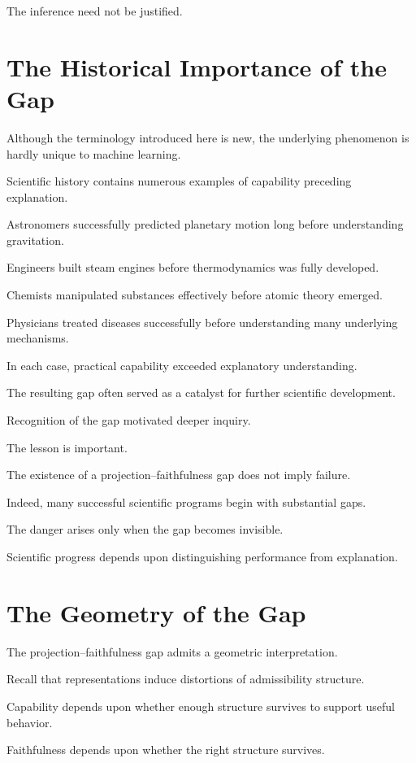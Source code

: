 \documentclass[11pt,oneside,openany]{book}
\begin{document}
The inference need not be justified.

\section{The Historical Importance of the Gap}

Although the terminology introduced here is new, the underlying phenomenon is hardly unique to machine learning.

Scientific history contains numerous examples of capability preceding explanation.

Astronomers successfully predicted planetary motion long before understanding gravitation.

Engineers built steam engines before thermodynamics was fully developed.

Chemists manipulated substances effectively before atomic theory emerged.

Physicians treated diseases successfully before understanding many underlying mechanisms.

In each case, practical capability exceeded explanatory understanding.

The resulting gap often served as a catalyst for further scientific development.

Recognition of the gap motivated deeper inquiry.

The lesson is important.

The existence of a projection--faithfulness gap does not imply failure.

Indeed, many successful scientific programs begin with substantial gaps.

The danger arises only when the gap becomes invisible.

Scientific progress depends upon distinguishing performance from explanation.

\section{The Geometry of the Gap}

The projection--faithfulness gap admits a geometric interpretation.

Recall that representations induce distortions of admissibility structure.

Capability depends upon whether enough structure survives to support useful behavior.

Faithfulness depends upon whether the right structure survives.
\end{document}
